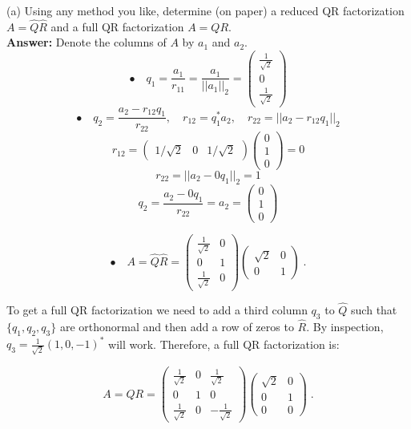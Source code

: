 \documentclass[11pt]{article}
\begin{document}
(a) Using any method you like, determine (on paper) a reduced QR factorization $A = \hat{Q}\hat{R}$ and a full QR factorization $A = QR$.\\

\textbf{Answer:} Denote the columns of $A$ by $a_1$ and $a_2$. 
$$\bullet \quad q_1 = \frac{a_1}{r_{11}} = \frac{a_1}{||a_1||_2} = \begin{pmatrix}
\frac{1}{\sqrt{2}} \\ 0 \\ \frac{1}{\sqrt{2}} \end{pmatrix}$$
$$\bullet \quad q_2 = \frac{a_2 - r_{12}q_1}{r_{22}}, \quad r_{12} = q_1^*a_2, \quad r_{22} = ||a_2 - r_{12}q_1||_2$$
$$r_{12} = \begin{pmatrix}1/\sqrt{2} & 0 & 1/\sqrt{2}\end{pmatrix} \begin{pmatrix}
0 \\ 1 \\ 0
\end{pmatrix} = 0$$
$$r_{22}  = ||a_2 - 0q_1||_2 = 1$$
$$q_2 = \frac{a_2-0q_1}{r_{22}} = a_2 = \begin{pmatrix}
0\\1\\0
\end{pmatrix}$$

$$\bullet \quad A = \hat{Q}\hat{R} = \begin{pmatrix}\frac{1}{\sqrt{2}}&0 \\ 0&1 \\ \frac{1}{\sqrt{2}} &0\end{pmatrix}
\begin{pmatrix}
\sqrt{2} &0 \\ 0 & 1
\end{pmatrix} \; .$$

To get a full QR factorization we need to add a third column $q_3$ to $\hat{Q}$ such that $\{q_1,q_2,q_3\}$ are orthonormal and then add a row of zeros to $\hat{R}$. By inspection, $q_3 = \frac{1}{\sqrt{2}}(1,0,-1)^*$ will work. Therefore, a full QR factorization is:

$$A = QR = \begin{pmatrix}\frac{1}{\sqrt{2}}&0& \frac{1}{\sqrt{2}}\\ 0&1& 0 \\ \frac{1}{\sqrt{2}} &0 &-\frac{1}{\sqrt{2}}\end{pmatrix}
\begin{pmatrix} \sqrt{2} &0 \\ 0 & 1 \\ 0 & 0\end{pmatrix} \; .$$
\end{document}
